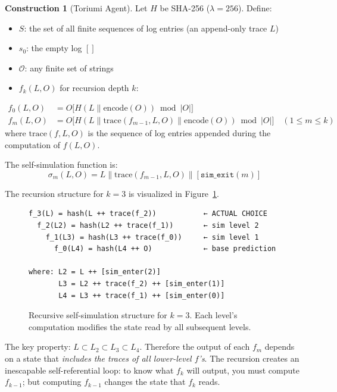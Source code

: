 \documentclass[12pt,a4paper]{article}
\theoremstyle{definition}
\newtheorem{construction}[theorem]{Construction}
\theoremstyle{remark}
\newcommand{\cO}{\mathcal{O}}
\begin{document}
\begin{construction}[Toriumi Agent]\label{cons:toriumi}
Let $H$ be SHA-256 ($\lambda = 256$). Define:
\begin{itemize}[itemsep=0pt]
\item $S$: the set of all finite sequences of log entries (an append-only
  trace $L$)
\item $s_0$: the empty log $[]$
\item $\cO$: any finite set of strings
\item $f_k(L, O)$ for recursion depth $k$:
\end{itemize}
\begin{align}
f_0(L, O) &= O\big[H(L \parallel \text{encode}(O)) \bmod |O|\big] \\
f_m(L, O) &= O\big[H(L \parallel \text{trace}(f_{m-1}, L, O) \parallel
             \text{encode}(O)) \bmod |O|\big] \quad (1 \leq m \leq k)
\end{align}
where $\text{trace}(f, L, O)$ is the sequence of log entries appended during
the computation of $f(L, O)$.

The self-simulation function is:
\begin{equation}
\sigma_m(L, O) = L \parallel \text{trace}(f_{m-1}, L, O) \parallel
                 [\texttt{sim\_exit}(m)]
\end{equation}
\end{construction}

The recursion structure for $k = 3$ is visualized in Figure~\ref{fig:recursion}.

\begin{figure}[ht]
\centering
\begin{verbatim}
f_3(L) = hash(L ++ trace(f_2))           ← ACTUAL CHOICE
  f_2(L2) = hash(L2 ++ trace(f_1))       ← sim level 2
    f_1(L3) = hash(L3 ++ trace(f_0))     ← sim level 1
      f_0(L4) = hash(L4 ++ O)            ← base prediction

where: L2 = L ++ [sim_enter(2)]
       L3 = L2 ++ trace(f_2) ++ [sim_enter(1)]
       L4 = L3 ++ trace(f_1) ++ [sim_enter(0)]
\end{verbatim}
\caption{Recursive self-simulation structure for $k=3$. Each level's computation
modifies the state read by all subsequent levels.}
\label{fig:recursion}
\end{figure}

The key property: $L \subset L_2 \subset L_3 \subset L_4$. Therefore the output
of each $f_m$ depends on a state that \emph{includes the traces of all
lower-level $f$'s}. The recursion creates an inescapable self-referential loop:
to know what $f_k$ will output, you must compute $f_{k-1}$; but computing
$f_{k-1}$ changes the state that $f_k$ reads.
\end{document}
